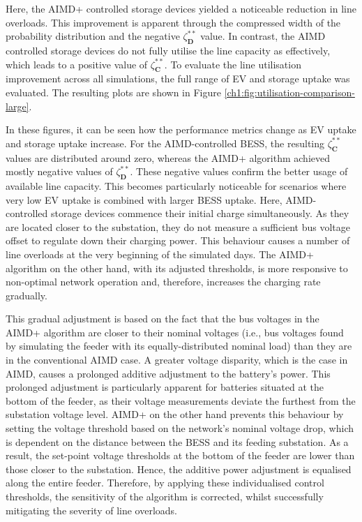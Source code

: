 

Here, the AIMD+ controlled storage devices yielded a noticeable reduction in line overloads. This improvement is apparent through the compressed width of the probability distribution and the negative $\zeta_\textbf{D}^{**}$ value. In contrast, the AIMD controlled storage devices do not fully utilise the line capacity as effectively, which leads to a positive value of $\zeta_\textbf{C}^{**}$. To evaluate the line utilisation improvement across all simulations, the full range of EV and storage uptake was evaluated. The resulting plots are shown in Figure \ref{ch1:fig:utilisation-comparison-large}.

In these figures, it can be seen how the performance metrics change as EV uptake and storage uptake increase. For the AIMD-controlled BESS, the resulting $\zeta_\textbf{C}^{**}$ values are distributed around zero, whereas the AIMD+ algorithm achieved mostly negative values of $\zeta_\textbf{D}^{**}$. These negative values confirm the better usage of available line capacity. This becomes particularly noticeable for scenarios where very low EV uptake is combined with larger BESS uptake. Here, AIMD-controlled storage devices commence their initial charge simultaneously. As they are located closer to the substation, they do not measure a sufficient bus voltage offset to regulate down their charging power. This behaviour causes a number of line overloads at the very beginning of the simulated days. The AIMD+ algorithm on the other hand, with its adjusted thresholds, is more responsive to non-optimal network operation and, therefore, increases the charging rate gradually.



This gradual adjustment is based on the fact that the bus voltages in the AIMD+ algorithm are closer to their nominal voltages (i.e., bus voltages found by simulating the feeder with its equally-distributed nominal load) than they are in the conventional AIMD case. A greater voltage disparity, which is the case in AIMD, causes a prolonged additive adjustment to the battery's power. This prolonged adjustment is particularly apparent for batteries situated at the bottom of the feeder, as their voltage measurements deviate the furthest from the substation voltage level. AIMD+ on the other hand prevents this behaviour by setting the voltage threshold based on the network's nominal voltage drop, which is dependent on the distance between the BESS and its feeding substation. As a result, the set-point voltage thresholds at the bottom of the feeder are lower than those closer to the substation. Hence, the additive power adjustment is equalised along the entire feeder. Therefore, by applying these individualised control thresholds, the sensitivity of the algorithm is corrected, whilst successfully mitigating the severity of line overloads.


